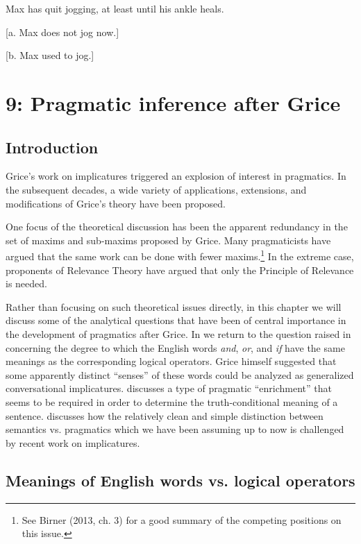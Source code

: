           Max has quit jogging, at least until his ankle heals.

{}[a. Max does not jog now.]

{}[b. Max used to jog.]
    \z

\chapter{{9}: Pragmatic inference after Grice}

\section{Introduction}\label{sec:} %

Grice’s work on implicatures triggered an explosion of interest in pragmatics. In the subsequent decades, a wide variety of applications, extensions, and modifications of Grice’s theory have been proposed.



One focus of the theoretical discussion has been the apparent redundancy in the set of maxims and sub-maxims proposed by Grice. Many pragmaticists have argued that the same work can be done with fewer maxims.\footnote{See Birner (2013, ch. 3) for a good summary of the competing positions on this issue.} In the extreme case, proponents of Relevance Theory have argued that only the Principle of Relevance is needed.



Rather than focusing on such theoretical issues directly, in this chapter we will discuss some of the analytical questions that have been of central importance in the development of pragmatics after Grice. In  we return to the question raised in  concerning the degree to which the English words \textit{and}, \textit{or}, and \textit{if} have the same meanings as the corresponding logical operators. Grice himself suggested that some apparently distinct “senses” of these words could be analyzed as generalized conversational implicatures.  discusses a type of pragmatic “enrichment” that seems to be required in order to determine the truth-conditional meaning of a sentence.  discusses how the relatively clean and simple distinction between semantics vs. pragmatics which we have been assuming up to now is challenged by recent work on implicatures.


\section{Meanings of English words vs. logical operators}\label{sec:} %

